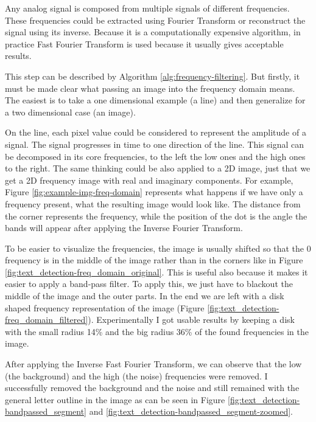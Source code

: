 Any analog signal is composed from multiple signals of different frequencies. These frequencies could be extracted using Fourier Transform \cite{book:fourier_transform} or reconstruct the signal using its inverse. Because it is a computationally expensive algorithm, in practice Fast Fourier Transform \cite{book:fourier_transform} is used because it usually gives acceptable results.

This step can be described by Algorithm \ref{alg:frequency-filtering}. But firstly, it must be made clear what passing an image into the frequency domain means. The easiest is to take a one dimensional example (a line) and then generalize for a two dimensional case (an image).

On the line, each pixel value could be considered to represent the amplitude of a signal. The signal progresses in time to one direction of the line. This signal can be decomposed in its core frequencies, to the left the low ones and the high ones to the right. The same thinking could be also applied to a 2D image, just that we get a 2D frequency image with real and imaginary components. For example, Figure \ref{fig:example-img-freq-domain} represents what happens if we have only a frequency present, what the resulting image would look like. The distance from the corner represents the frequency, while the position of the dot is the angle the bands will appear after applying the Inverse Fourier Transform.

To be easier to visualize the frequencies, the image is usually shifted so that the 0 frequency is in the middle of the image rather than in the corners like in Figure \ref{fig:text_detection-freq_domain_original}. This is useful also because it makes it easier to apply a band-pass filter. To apply this, we just have to blackout the middle of the image and the outer parts. In the end we are left with a disk shaped frequency representation of the image (Figure \ref{fig:text_detection-freq_domain_filtered}). Experimentally I got usable results by keeping a disk with the small radius 14\% and the big radius 36\% of the found frequencies in the image.

After applying the Inverse Fast Fourier Transform, we can observe that the low (the background) and the high (the noise) frequencies were removed. I successfully removed the background and the noise and still remained with the general letter outline in the image as can be seen in Figure \ref{fig:text_detection-bandpassed_segment} and \ref{fig:text_detection-bandpassed_segment-zoomed}.

